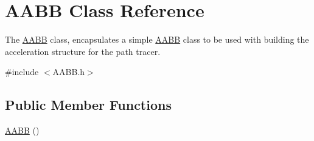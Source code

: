 \hypertarget{classAABB}{\section{A\-A\-B\-B Class Reference}
\label{classAABB}
}


The \hyperlink{classAABB}{A\-A\-B\-B} class, encapsulates a simple \hyperlink{classAABB}{A\-A\-B\-B} class to be used with building the acceleration structure for the path tracer.  




{\ttfamily \#include $<$A\-A\-B\-B.\-h$>$}

\subsection*{Public Member Functions}
\begin{DoxyCompactItemize}
\item 
\hypertarget{classAABB_a5f5baf6c533905aa1456b3a3eb57bab2}{\hyperlink{classAABB_a5f5baf6c533905aa1456b3a3eb57bab2}{A\-A\-B\-B} ()}\label{classAABB_a5f5baf6c533905aa1456b3a3eb57bab2}


\end{DoxyCompactItemize}
